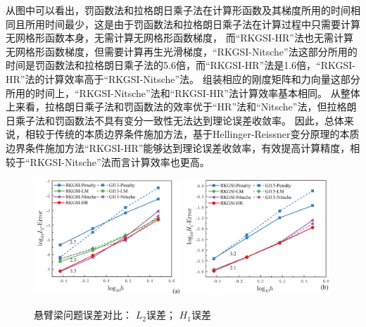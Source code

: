 从图中可以看出，罚函数法和拉格朗日乘子法在计算形函数及其梯度所用的时间相同且所用时间最少，这是由于罚函数法和拉格朗日乘子法在计算过程中只需要计算无网格形函数本身，无需计算无网格形函数梯度，
而“RKGSI-HR”法也无需计算无网格形函数梯度，但需要计算再生光滑梯度，“RKGSI-Nitsche”法这部分所用的时间是罚函数法和拉格朗日乘子法的5.6倍，而“RKGSI-HR”法是1.6倍，“RKGSI-HR”法的计算效率高于“RKGSI-Nitsche”法。
组装相应的刚度矩阵和力向量这部分所用的时间上，“RKGSI-Nitsche”法和“RKGSI-HR”法计算效率基本相同。
从整体上来看，拉格朗日乘子法和罚函数法的效率优于“HR”法和“Nitsche”法，但拉格朗日乘子法和罚函数法不具有变分一致性无法达到理论误差收敛率。
因此，总体来说，相较于传统的本质边界条件施加方法，基于Hellinger-Reissner变分原理的本质边界条件施加方法“RKGSI-HR”能够达到理论误差收敛率，有效提高计算精度，相较于“RKGSI-Nitsche”法而言计算效率也更高。
\begin{figure}[H]
\centering
\begin{subcaptiongroup}
    \includegraphics[width=0.49\textwidth]{figure/EHR/cantilever/L2.png}
    \label{CL2}
    \includegraphics[width=0.49\textwidth]{figure/EHR/cantilever/H1.png}
    \label{CH1}
    \end{subcaptiongroup}
\caption{悬臂梁问题误差对比： $L_2$误差； $H_1$误差}
\label{ECLH}
\end{figure}
